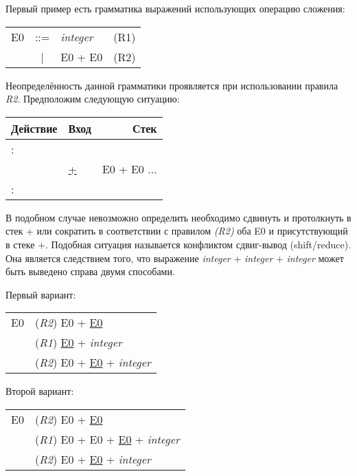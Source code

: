 Первый пример есть грамматика выражений использующих операцию сложения:

\begin{center}
	\begin{tabular}{rclc}
		E0 & ::= & {\it integer} & (R1) \\
		 & | & E0 + E0 & (R2) \\
	\end{tabular}
\end{center}

Неопределённость данной грамматики проявляется при использовании правила {\it
R2}. Предположим следующую ситуацию:

\begin{table}[hс]
	\begin{center}
	\begin{tabular}{|l|l|r|}
	\hline
	Действие  & Вход & Стек \\
	\hline
	: & & \\
	\hline
	& \underline{+} & E0 + E0 $\ldots$ \\
	\hline
	: & & \\
	\hline
	\end{tabular}
	\end{center}
\end{table}

В подобном случае невозможно определить необходимо сдвинуть и протолкнуть в стек
+ или сократить в соответствии с правилом {\it (R2)} оба E0 и присутствующий в
стеке +. Подобная ситуация называется конфликтом сдвиг-вывод (shift/reduce). Она
является следствием того, что выражение {\it integer} + {\it integer} + {\it
integer} может быть выведено справа двумя способами.

Первый вариант:

\begin{center}
	\begin{tabular}{rl}
		E0 & ({\it R2}) E0 + \underline{E0} \\
		 & ({\it R1}) \underline{E0} + {\it integer} \\
		 & ({\it R2}) E0 + \underline{E0} + {\it integer} \\
	\end{tabular}
\end{center}

Второй вариант:

\begin{center}
	\begin{tabular}{rl}
		E0 & ({\it R2}) E0 + \underline{E0} \\
		 & ({\it R1}) E0 + E0 + \underline{E0} + {\it integer} \\
		 & ({\it R2}) E0 + \underline{E0} + {\it integer} \\
	\end{tabular}
\end{center}

